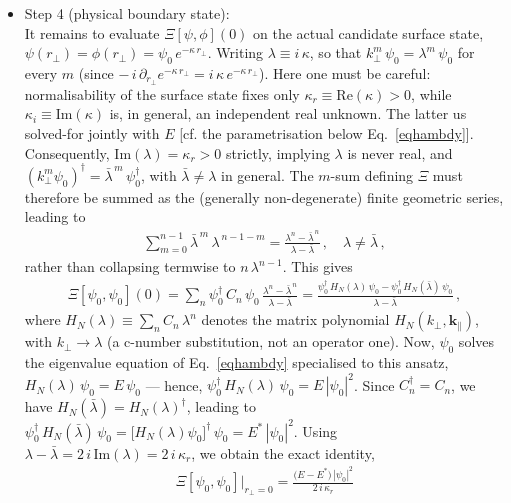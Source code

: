 \documentclass[aps,prb,onecolumn, footinbib, 10pt]{revtex4-2}
\begin{document}
{{\begin{itemize}
\item  Step 4 (physical boundary state): 
\\It remains to evaluate $\Xi[\psi,\phi](0)$ on the actual candidate surface state, $\psi(r_\perp)=\phi(r_\perp)=\psi_0\, e^{-\kappa \, r_\perp}$. Writing  $\lambda \equiv i\, \kappa$, so that $k_\perp^m\, \psi_0=\lambda^m \, \psi_0$ for every $m$ (since $-\,i \, \partial_{r_\perp} e^{-\kappa \, r_\perp}=i\, \kappa\, e^{-\kappa \, r_\perp}$). Here one must be careful: normalisability of the surface state fixes only $\kappa_r\equiv\mathrm{Re}(\kappa)>0$, while $\kappa_i \equiv\mathrm{Im}(\kappa)$ is, in general, an independent real unknown. The latter us solved-for jointly with $E$ [cf. the parametrisation below Eq.~\eqref{eqhambdy}]. Consequently, $\mathrm{Im}(\lambda)=\kappa_r>0$ strictly, implying $\lambda$ is never real, and $(k_\perp^m\psi_0)^\dagger=\bar\lambda^{\,m} \, \psi_0^\dagger$, with $\bar\lambda\ne\lambda$ in general. The $m$-sum defining $\Xi$ must therefore be summed as the (generally non-degenerate) finite geometric series, leading to
\begin{align}
\sum_{m=0}^{n-1}\bar\lambda^{\,m} \,\lambda^{\,n-1-m}
= \frac{\lambda^n-\bar\lambda^{\,n}}{\lambda-\bar\lambda}\,,\quad \lambda\ne\bar\lambda\,,
\end{align}
rather than collapsing termwise to $n \,\lambda^{n-1}$. This gives
\begin{align}
\Xi[\psi_0,\psi_0](0)=\sum_n \psi_0^\dagger \, C_n \,\psi_0\,
\frac{\lambda^n-\bar\lambda^{\,n}}{\lambda-\bar\lambda}
=\frac{\psi_0^\dagger \,H_N(\lambda)\,\psi_0-\psi_0^\dagger \, H_N(\bar\lambda)\,\psi_0}{\lambda-\bar\lambda}\,,
\end{align}
where $H_N(\lambda)\equiv \sum_n C_n \, \lambda^n$ denotes the matrix polynomial $H_N(k_\perp,\boldsymbol k_\parallel)$, with $k_\perp\to\lambda$ (a c-number substitution, not an operator one). Now, $\psi_0$ solves the eigenvalue equation of Eq.~\eqref{eqhambdy} specialised to this ansatz, $H_N(\lambda)\, \psi_0=E \, \psi_0$ --- hence, $\psi_0^\dagger \,H_N(\lambda) \,\psi_0=E\,|\psi_0|^2$.
Since $C_n^\dagger=C_n$, we have $H_N(\bar\lambda)=H_N(\lambda)^\dagger$, leading to $\psi_0^\dagger\, H_N(\bar\lambda)\,\psi_0
=\big[H_N(\lambda)\psi_0\big]^\dagger \, \psi_0 =E^*\, |\psi_0|^2$. Using $\lambda-\bar\lambda=2 \, i\,\mathrm{Im}(\lambda)=2 \,i \,\kappa_r$, we obtain the exact identity,
\begin{align}
\Xi[\psi_0,\psi_0]\big\vert_{r_\perp=0}=\frac{\big(E-E^*\big)\,|\psi_0|^2}{2\, i\, \kappa_r}

\end{align}
\end{itemize}}}
\end{document}
